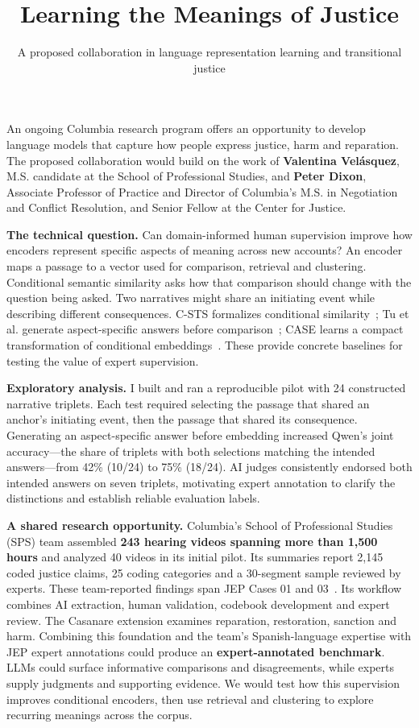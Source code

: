 \documentclass{article}
\title{Learning the Meanings of Justice}
\author{A proposed collaboration in language representation learning and transitional justice}
\begin{document}
\maketitle

An ongoing Columbia research program offers an opportunity to develop language models that capture how people express justice, harm and reparation. The proposed collaboration would build on the work of \textbf{Valentina Velásquez}, M.S. candidate at the School of Professional Studies, and \textbf{Peter Dixon}, Associate Professor of Practice and Director of Columbia's M.S. in Negotiation and Conflict Resolution, and Senior Fellow at the Center for Justice.

\textbf{The technical question.} Can domain-informed human supervision improve how encoders represent specific aspects of meaning across new accounts? An encoder maps a passage to a vector used for comparison, retrieval and clustering. Conditional semantic similarity asks how that comparison should change with the question being asked. Two narratives might share an initiating event while describing different consequences. C-STS formalizes conditional similarity~\citep{deshpande2023}; Tu et al. generate aspect-specific answers before comparison~\citep{tu2024}; CASE learns a compact transformation of conditional embeddings~\citep{zhang2026}. These provide concrete baselines for testing the value of expert supervision.

\textbf{Exploratory analysis.} I built and ran a reproducible pilot with 24 constructed narrative triplets. Each test required selecting the passage that shared an anchor's initiating event, then the passage that shared its consequence. Generating an aspect-specific answer before embedding increased Qwen's joint accuracy---the share of triplets with both selections matching the intended answers---from 42\% (10/24) to 75\% (18/24). AI judges consistently endorsed both intended answers on seven triplets, motivating expert annotation to clarify the distinctions and establish reliable evaluation labels.

\textbf{A shared research opportunity.} Columbia's School of Professional Studies (SPS) team assembled \textbf{243 hearing videos spanning more than 1,500 hours} and analyzed 40 videos in its initial pilot. Its summaries report 2,145 coded justice claims, 25 coding categories and a 30-segment sample reviewed by experts. These team-reported findings span JEP Cases 01 and 03~\citep{team}. Its workflow combines AI extraction, human validation, codebook development and expert review. The Casanare extension examines reparation, restoration, sanction and harm. Combining this foundation and the team's Spanish-language expertise with JEP expert annotations could produce an \textbf{expert-annotated benchmark}. LLMs could surface informative comparisons and disagreements, while experts supply judgments and supporting evidence. We would test how this supervision improves conditional encoders, then use retrieval and clustering to explore recurring meanings across the corpus.
\end{document}

